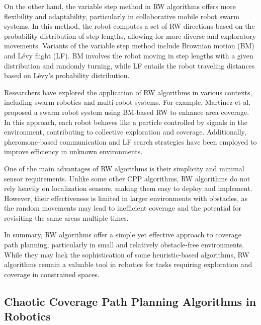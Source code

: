 On the other hand, the variable step method in RW algorithms offers more flexibility and adaptability, particularly in collaborative mobile robot swarm systems. In this method, the robot computes a set of RW directions based on the probability distribution of step lengths, allowing for more diverse and exploratory movements. Variants of the variable step method include Brownian motion (BM) and Lévy flight (LF). BM involves the robot moving in step lengths with a given distribution and randomly turning, while LF entails the robot traveling distances based on Lévy's probability distribution.

\vspace*{6mm}

Researchers have explored the application of RW algorithms in various contexts, including swarm robotics and multi-robot systems. For example, Martinez et al. proposed a swarm robot system using BM-based RW to enhance area coverage. In this approach, each robot behaves like a particle controlled by signals in the environment, contributing to collective exploration and coverage. Additionally, pheromone-based communication and LF search strategies have been employed to improve efficiency in unknown environments.

\vspace*{6mm}

One of the main advantages of RW algorithms is their simplicity and minimal sensor requirements. Unlike some other CPP algorithms, RW algorithms do not rely heavily on localization sensors, making them easy to deploy and implement. However, their effectiveness is limited in larger environments with obstacles, as the random movements may lead to inefficient coverage and the potential for revisiting the same areas multiple times.

\vspace*{6mm}

In summary, RW algorithms offer a simple yet effective approach to coverage path planning, particularly in small and relatively obstacle-free environments. While they may lack the sophistication of some heuristic-based algorithms, RW algorithms remain a valuable tool in robotics for tasks requiring exploration and coverage in constrained spaces.

\subsection{Chaotic Coverage Path Planning Algorithms in Robotics}

